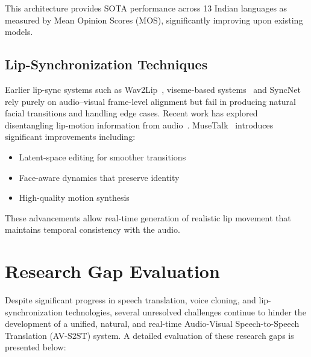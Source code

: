 \documentclass[12pt,oneside]{report}
\begin{document}
This architecture provides SOTA performance across 13 Indian languages as measured by Mean Opinion Scores (MOS), significantly improving upon existing models.

\subsection{Lip-Synchronization Techniques}

Earlier lip-sync systems such as Wav2Lip~\cite{prajwal2020lipsync}, viseme-based systems~\cite{hoon2015viseme} and SyncNet rely purely on audio--visual frame-level alignment but fail in producing natural facial transitions and handling edge cases. Recent work has explored disentangling lip-motion information from audio~\cite{wang2022lipdisentangle}. MuseTalk~\cite{zhang2023musetalk} introduces significant improvements including:
\begin{itemize}
    \item Latent-space editing for smoother transitions
    \item Face-aware dynamics that preserve identity
    \item High-quality motion synthesis
\end{itemize}

These advancements allow real-time generation of realistic lip movement that maintains temporal consistency with the audio.
\section{Research Gap Evaluation}

Despite significant progress in speech translation, voice cloning, and lip-synchronization technologies, several unresolved challenges continue to hinder the development of a unified, natural, and real-time Audio-Visual Speech-to-Speech Translation (AV-S2ST) system. A detailed evaluation of these research gaps is presented below:
\end{document}
